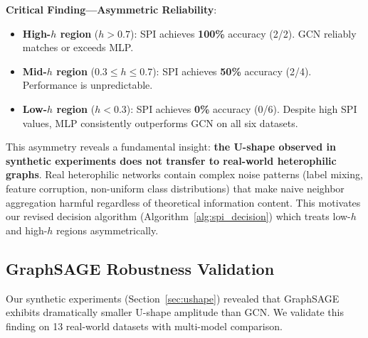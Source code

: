 \textbf{Critical Finding---Asymmetric Reliability}:
\begin{itemize}
    \item \textbf{High-$h$ region} ($h > 0.7$): SPI achieves \textbf{100\%} accuracy (2/2). GCN reliably matches or exceeds MLP.
    \item \textbf{Mid-$h$ region} ($0.3 \leq h \leq 0.7$): SPI achieves \textbf{50\%} accuracy (2/4). Performance is unpredictable.
    \item \textbf{Low-$h$ region} ($h < 0.3$): SPI achieves \textbf{0\%} accuracy (0/6). Despite high SPI values, MLP consistently outperforms GCN on all six datasets.
\end{itemize}

This asymmetry reveals a fundamental insight: \textbf{the U-shape observed in synthetic experiments does not transfer to real-world heterophilic graphs}. Real heterophilic networks contain complex noise patterns (label mixing, feature corruption, non-uniform class distributions) that make naive neighbor aggregation harmful regardless of theoretical information content. This motivates our revised decision algorithm (Algorithm~\ref{alg:spi_decision}) which treats low-$h$ and high-$h$ regions asymmetrically.

\subsection{GraphSAGE Robustness Validation}

Our synthetic experiments (Section~\ref{sec:ushape}) revealed that GraphSAGE exhibits dramatically smaller U-shape amplitude than GCN. We validate this finding on 13 real-world datasets with multi-model comparison.

